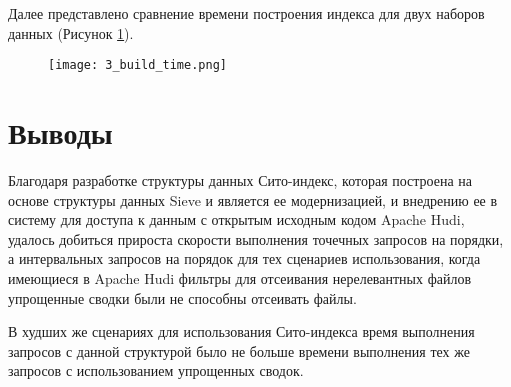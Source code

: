 Далее представлено сравнение времени построения индекса для двух наборов данных (Рисунок \ref{figure:index_build_time}).

\begin{figure}[h]
    \centering
    \texttt{[image: 3\_build\_time.png]}
    \caption{}
    \label{figure:index_build_time}
\end{figure}

\newpage
\section*{Выводы}

Благодаря разработке структуры данных Сито-индекс, которая построена на основе структуры данных Sieve и является ее модернизацией, и внедрению ее в систему для доступа к данным с открытым исходным кодом Apache Hudi, удалось добиться прироста скорости выполнения точечных запросов на порядки, а интервальных запросов на порядок для тех сценариев использования, когда имеющиеся в Apache Hudi фильтры для отсеивания нерелевантных файлов упрощенные сводки были не способны отсеивать файлы.

В худших же сценариях для использования Сито-индекса время выполнения запросов с данной структурой было не больше времени выполнения тех же запросов с использованием упрощенных сводок.

